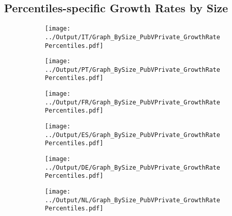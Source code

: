 \documentclass[12pt,notitlepage]{article}
\begin{document}
\subsection{Percentiles-specific Growth Rates by Size}
\begin{figure}[!htpb]
\centering
\begin{subfigure}{.49\textwidth}
    \centering
 \texttt{[image: ../Output/IT/Graph\_BySize\_PubVPrivate\_GrowthRatePercentiles.pdf]}
\end{subfigure}%
\begin{subfigure}{.49\textwidth}
    \centering
 \texttt{[image: ../Output/PT/Graph\_BySize\_PubVPrivate\_GrowthRatePercentiles.pdf]}
\end{subfigure}
\begin{subfigure}{.49\textwidth}
    \centering
 \texttt{[image: ../Output/FR/Graph\_BySize\_PubVPrivate\_GrowthRatePercentiles.pdf]}
\end{subfigure}%
\begin{subfigure}{.49\textwidth}
    \centering
 \texttt{[image: ../Output/ES/Graph\_BySize\_PubVPrivate\_GrowthRatePercentiles.pdf]}
\end{subfigure}
\begin{subfigure}{.49\textwidth}
    \centering
 \texttt{[image: ../Output/DE/Graph\_BySize\_PubVPrivate\_GrowthRatePercentiles.pdf]}
\end{subfigure}
\begin{subfigure}{.49\textwidth}
    \centering
 \texttt{[image: ../Output/NL/Graph\_BySize\_PubVPrivate\_GrowthRatePercentiles.pdf]}
\end{subfigure}
\end{figure}
\end{document}

